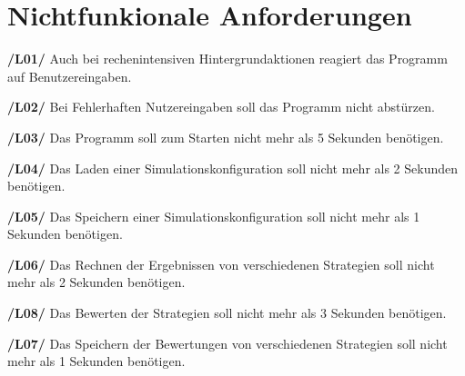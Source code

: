 \section{Nichtfunkionale Anforderungen}
\textbf{/L01/ }
Auch bei rechenintensiven Hintergrundaktionen reagiert das Programm auf Benutzereingaben.

\textbf{/L02/}
Bei Fehlerhaften Nutzereingaben soll das Programm nicht abstürzen.

\textbf{/L03/}
Das Programm soll zum Starten nicht mehr als 5 Sekunden benötigen.

\textbf{/L04/}
Das Laden einer Simulationskonfiguration soll nicht mehr als 2 Sekunden benötigen.

\textbf{/L05/}
Das Speichern einer Simulationskonfiguration soll nicht mehr als 1 Sekunden benötigen.

\textbf{/L06/}
Das Rechnen der Ergebnissen von verschiedenen Strategien soll nicht mehr als 2 Sekunden benötigen.

\textbf{/L08/}
Das Bewerten der Strategien soll nicht mehr als 3 Sekunden benötigen.

\textbf{/L07/}
Das Speichern der Bewertungen von verschiedenen Strategien soll nicht mehr als 1 Sekunden benötigen.